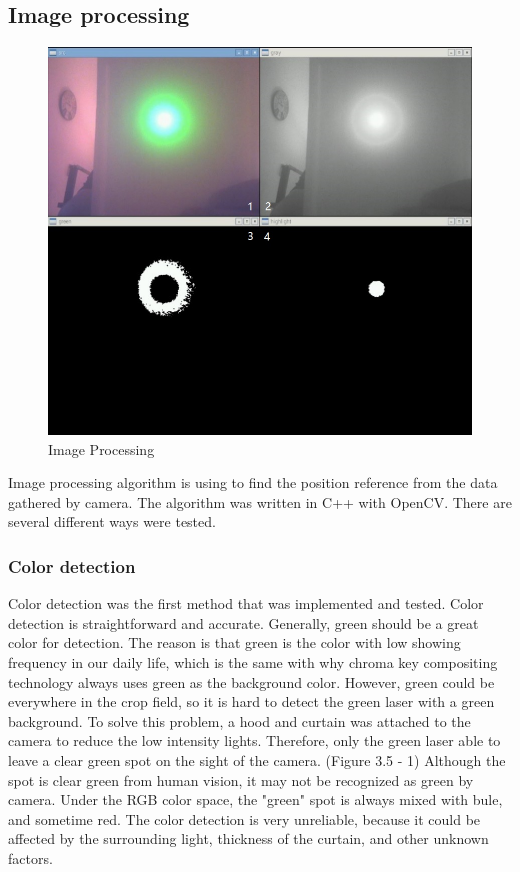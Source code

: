 \documentclass[letterpaper,12pt,oneside]{book}
\begin{document}
		\subsection{Image processing}
		\begin{figure}[ht!]
			\begin{center}
				\includegraphics[scale = 0.7]{imaging.jpg}
				\caption{Image Processing}
			\end{center}
		\end{figure}
		Image processing algorithm is using to find the position reference from the data gathered by camera. The algorithm was written in C++ with OpenCV. There are several different ways were tested.
		
		\subsubsection{Color detection}
		
		Color detection was the first method that was implemented and tested. Color detection is straightforward and accurate. Generally, green should be a great color for detection. The reason is that green is the color with low showing frequency in our daily life, which is the same with why chroma key compositing technology always uses green as the background color. However, green could be everywhere in the crop field, so it is hard to detect the green laser with a green background. To solve this problem, a hood and curtain was attached to the camera to reduce the low intensity lights. Therefore, only the green laser able to leave a clear green spot on the sight of the camera. (Figure 3.5 - 1) Although the spot is clear green from human vision, it may not be recognized as green by camera. Under the RGB color space, the "green" spot is always mixed with bule, and sometime red. The color detection is very unreliable, because it could be affected by the surrounding light, thickness of the curtain, and other unknown factors.
\end{document}
